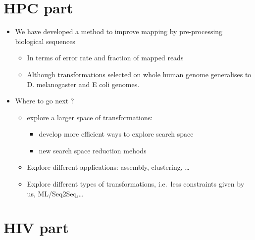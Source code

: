\documentclass[
  11pt,
  twoside,
  BCOR=10mm,
  listof=totoc]{scrbook}
\begin{document}
\hypertarget{hpc-part}{%
\section*{HPC part}\label{hpc-part}}

\begin{itemize}
\item
  We have developed a method to improve mapping by pre-processing biological sequences

  \begin{itemize}
  \item
    In terms of error rate and fraction of mapped reads
  \item
    Although transformations selected on whole human genome generalises to D. melanogaster and E coli genomes.
  \end{itemize}
\item
  Where to go next ?

  \begin{itemize}
  \item
    explore a larger space of transformations:

    \begin{itemize}
    \item
      develop more efficient ways to explore search space
    \item
      new search space reduction mehods
    \end{itemize}
  \item
    Explore different applications: assembly, clustering, \ldots{}
  \item
    Explore different types of transformations, i.e.~less constraints given by us, ML/Seq2Seq,\ldots{}
  \end{itemize}
\end{itemize}

\hypertarget{hiv-part}{%
\section*{HIV part}\label{hiv-part}}
\end{document}
